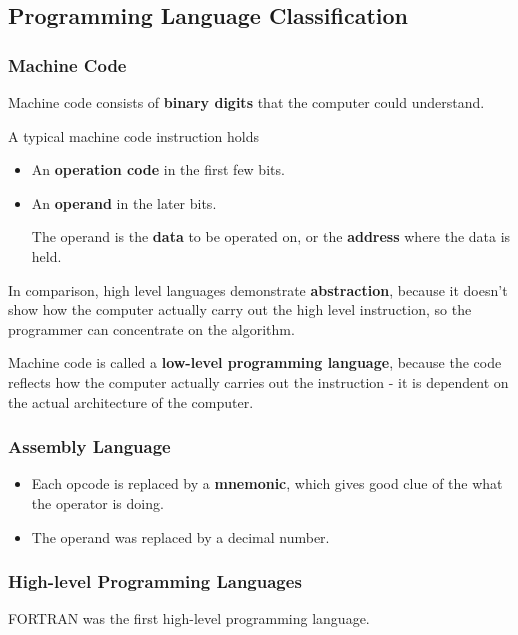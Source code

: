 \subsection{Programming Language Classification}

\subsubsection*{Machine Code}

Machine code consists of \textbf{binary digits} that the computer could understand.

A typical machine code instruction holds
\begin{itemize}
    \item An \textbf{operation code} in the first few bits.
    \item An \textbf{operand} in the later bits.

        The operand is the \textbf{data} to be operated on, or the \textbf{address} where the data is held.
\end{itemize}

In comparison, high level languages demonstrate \textbf{abstraction}, because it doesn't show how the computer actually carry out the high level instruction, so the programmer can concentrate on the algorithm.

Machine code is called a \textbf{low-level programming language}, because the code reflects how the computer actually carries out the instruction - it is dependent on the actual architecture of the computer.

\subsubsection*{Assembly Language}

\begin{itemize}
    \item Each opcode is replaced by a \textbf{mnemonic}, which gives good clue of the what the operator is doing.
    \item The operand was replaced by a decimal number.
\end{itemize}

\subsubsection*{High-level Programming Languages}

FORTRAN was the first high-level programming language.

